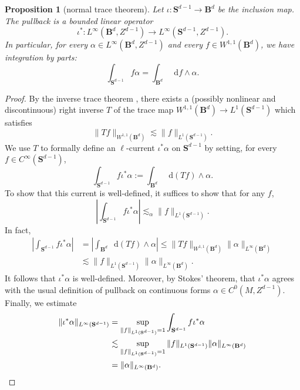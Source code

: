 \documentclass[reqno,11pt]{amsart}
\newcommand{\Sph}{\mathbf S}
\newcommand{\Ball}{\mathbf{B}}
\newcommand*\dif{\mathop{}\!\mathrm{d}}
\newtheorem{proposition}[theorem]{Proposition}
\theoremstyle{definition}
\numberwithin{equation}{section}
\begin{document}
\begin{proposition}[normal trace theorem]
Let $\iota: \Sph^{d - 1} \to \Ball^d$ be the inclusion map.
The pullback is a bounded linear operator 
$$\iota^*: L^\infty(\Ball^d, Z^{d - 1}) \to L^\infty(\Sph^{d - 1}, Z^{d - 1}).$$
In particular, for every $\alpha \in L^\infty(\Ball^d, Z^{d - 1})$ and every $f \in W^{1, 1}(\Ball^d)$, we have integration by parts:
\begin{equation}\label{Stokes trace}
	\int_{\Sph^{d - 1}} f\alpha = \int_{\Ball^d} \dif f \wedge \alpha.
\end{equation}
\end{proposition}
\begin{proof}
By the inverse trace theorem \cite[Teorema 1.II]{Gagliardo1957}, there exists a (possibly nonlinear and discontinuous) right inverse $T$ of the trace map $W^{1, 1}(\Ball^d) \to L^1(\Sph^{d - 1})$ which satisfies 
$$\|Tf\|_{W^{1, 1}(\Ball^d)} \lesssim \|f\|_{L^1(\Sph^{d - 1})}.$$
We use $T$ to formally define an $\ell$-current $\iota^* \alpha$ on $\Sph^{d - 1}$ by setting, for every $f \in C^\infty(\Sph^{d - 1})$,
$$\int_{\Sph^{d - 1}} f\iota^* \alpha := \int_{\Ball^d} \dif(Tf) \wedge \alpha.$$
To show that this current is well-defined, it suffices to show that for any $f$, 
$$\left|\int_{\Sph^{d - 1}} f\iota^* \alpha\right| \lesssim_\alpha \|f\|_{L^1(\Sph^{d - 1})}.$$
In fact, 
\begin{align*}
\left|\int_{\Sph^{d - 1}} f \iota^*\alpha\right|
&= \left|\int_{\Ball^d} \dif(Tf) \wedge \alpha\right| \leq \|Tf\|_{W^{1, 1}(\Ball^d)} \|\alpha\|_{L^\infty(\Ball^d)} \\
&\lesssim \|f\|_{L^1(\Sph^{d - 1})} \|\alpha\|_{L^\infty(\Ball^d)}.
\end{align*}
It follows that $\iota^* \alpha$ is well-defined.
Moreover, by Stokes' theorem, that $\iota^* \alpha$ agrees with the usual definition of pullback on continuous forms $\alpha \in C^0(M, Z^{d - 1})$.
Finally, we estimate 
\begin{align*}
\|\iota^* \alpha\|_{L^\infty(\Sph^{d - 1})}
&= \sup_{\|f\|_{L^1(\Sph^{d - 1})} = 1} \int_{\Sph^{d - 1}} f \iota^*\alpha \\
&\lesssim \sup_{\|f\|_{L^1(\Sph^{d - 1})} = 1} \|f\|_{L^1(\Sph^{d - 1})} \|\alpha\|_{L^\infty(\Ball^d)} \\
&= \|\alpha\|_{L^\infty(\Ball^d)}. \qedhere 
\end{align*}
\end{proof}
\end{document}

